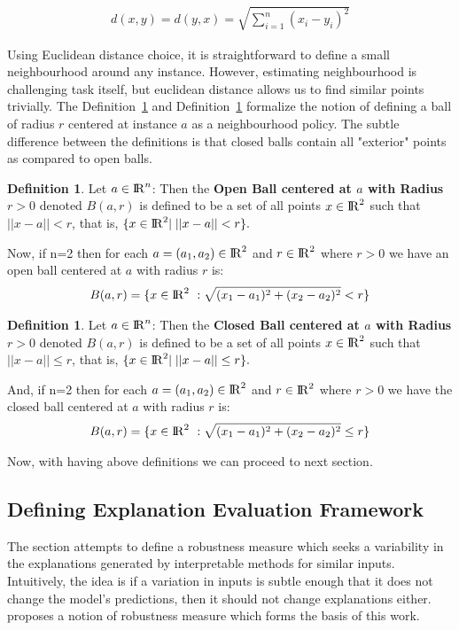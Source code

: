\documentclass[english]{tktltiki2}
\theoremstyle{definition}
\newtheorem{definition}[thm]{Definition}
\theoremstyle{remark}
\begin{document}
\begin{align*}
d(x,y) = d(y,x) = \sqrt{\sum_{i=1}^{n}(x_i - y_i)^2}
\end{align*}

Using Euclidean distance choice, it is straightforward to define a small neighbourhood around any instance. However, estimating neighbourhood is challenging task itself, but euclidean distance allows us to find similar points trivially. The Definition~\ref{def:1} and Definition~\ref{def:2} formalize the notion of defining a ball of radius $r$ centered at instance $a$ as a neighbourhood policy. The subtle difference between the definitions is that closed balls contain all "exterior" points as compared to open balls.
\begin{definition}\label{def:1}{Let $a \in {\rm I\!R}^n$: Then the \textbf{Open Ball centered at $a$ with Radius $r > 0$} denoted $B(a,r)$ is defined to be a set of all points $x \in {\rm I\!R}^2$ such that $||x-a|| < r$, that is, $\{x \in {\rm I\!R}^2 |\;||x - a|| < r\}.$}
\end{definition}
Now, if n=2 then for each $a = (a_1,a_2) \in {\rm I\!R}^2$ and $r \in {\rm I\!R}^2$ where $r > 0$ we have an open ball centered at $a$ with radius $r$ is:
\begin{align*}
B(a,r) = \{x \in {\rm I\!R}^2\ : \sqrt{(x_1 - a_1)^2 + (x_2 - a_2)^2} < r\}
\end{align*}
\begin{definition}\label{def:2}{Let $a \in {\rm I\!R}^n$: Then the \textbf{Closed Ball centered at $a$ with Radius $r > 0$} denoted $B(a,r)$ is defined to be a set of all points $x \in {\rm I\!R}^2$ such that $||x-a|| \leq r$, that is, $\{x \in {\rm I\!R}^2 |\;||x - a|| \leq r\}.$}
\end{definition}
And, if n=2 then for each $a = (a_1,a_2) \in {\rm I\!R}^2$ and $r \in {\rm I\!R}^2$ where $r > 0$ we have the closed ball centered at $a$ with radius $r$ is:
\begin{align*}
B(a,r) = \{x \in {\rm I\!R}^2\ : \sqrt{(x_1 - a_1)^2 + (x_2 - a_2)^2} \leq r\}
\end{align*}

Now, with having above definitions we can proceed to next section.

\subsection{Defining Explanation Evaluation Framework}\label{sec:defining_explanation_evaluation_framework} %
The section attempts to define a robustness measure which seeks a variability in the explanations generated by interpretable methods for similar inputs. Intuitively, the idea is if a variation in inputs is subtle enough that it does not change the model's predictions, then it should not change explanations either. \citet{alvarez2018robustness} proposes a notion of robustness measure which forms the basis of this work.
\end{document}
